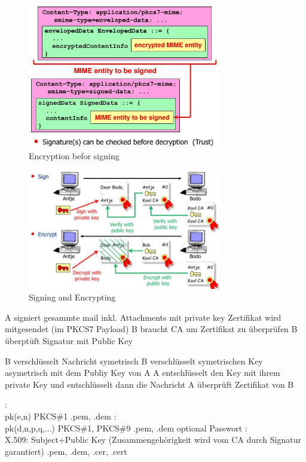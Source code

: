 \documentclass[ngerman,a4paper,12pt]{scrreprt}
\begin{document}
\begin{figure}[H]
	\centering
	\includegraphics[width=0.75\textwidth]{img/V8.6.jpg}
	\caption{Encryption befor signing}
	\label{}
\end{figure}

\begin{figure}[H]
	\centering
	\includegraphics[width=0.75\textwidth]{img/V8.7.jpg}
	\caption{Signing and Encrypting}
	\label{}
\end{figure}

\ul
	\li A signiert gesammte mail inkl. Attachments mit private key
	\li Zertifikat wird mitgesendet (im PKCS7 Payload)
	\li B braucht CA um Zertifikat zu überprüfen
	\li B überptüft Signatur mit Public Key
\ulE

\ul
	\li B verschlüsselt Nachricht symetrisch
	\li B verschlüsselt symetrischen Key asymetrisch mit dem Publiy Key von A
	\li A entschlüsselt den Key mit ihrem private Key und entschlüsselt dann die Nachricht
	\li A überprüft Zertifikat von B
\ulE


\dl
	:\\
	   	\ul
    		\li pk(e,n) 
    		\li PKCS\#1 
    		\li .pem, .dem
    	\ulE
    :\\
    	\ul
    		\li pk(d,n,p,q,...) 
    		\li PKCS\#1, PKCS\#9 
    		\li .pem, .dem 
    		\li optional Passwort
    	\ulE
    :\\
    	\ul
    		\li X.509: 
    		\li Subject+Public Key (Zusammengehörigkeit wird vom CA durch Signatur garantiert) 
    		\li .pem, .dem, .cer, .cert
    	\ulE
\dlE
\end{document}
